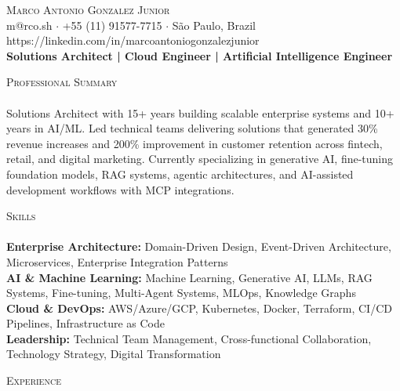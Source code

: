 \documentclass[a4paper]{article}
\newcommand{\lineunder} {
    \vspace*{-8pt} \\
    \hspace*{-18pt} \hrulefill \\
}
\newcommand{\header} [1] {
    {\hspace*{-18pt}\vspace*{6pt} \textsc{#1}}
    \vspace*{-6pt} \lineunder
}
\begin{document}
\newlength{\sectionindent}
\setlength{\sectionindent}{-0.4in} %

\renewcommand{\header}[1] {
    {\hspace*{-18pt}\vspace*{6pt} \textsc{#1}}
    \vspace*{-6pt} \lineunder
}
\vspace*{-40pt}

\vspace*{-10pt}
\begin{center}
    {\Huge \scshape {Marco Antonio Gonzalez Junior}}                \\
    \vspace{2.5pt}
    m@rco.sh $\cdot$ +55 (11) 91577-7715 $\cdot$ São Paulo, Brazil  \\
    \vspace{2.5pt}
    https://linkedin.com/in/marcoantoniogonzalezjunior              \\
    \vspace{1.25mm}
    \textbf{Solutions Architect | Cloud Engineer | Artificial Intelligence Engineer}
\end{center}
\vspace{-1.5mm}
\header{Professional Summary}
Solutions Architect with 15+ years building scalable enterprise systems and 10+ years in AI/ML. Led technical teams delivering solutions that generated 30\% revenue increases and 200\% improvement in customer retention across fintech, retail, and digital marketing. Currently specializing in generative AI, fine-tuning foundation models, RAG systems, agentic architectures, and AI-assisted development workflows with MCP integrations. \\
\vspace{0.5mm}
\header{Skills}
\vspace{0.5mm}
\textbf{Enterprise Architecture:} Domain-Driven Design, Event-Driven Architecture, Microservices, Enterprise Integration Patterns \\
\textbf{AI \& Machine Learning:} Machine Learning, Generative AI, LLMs, RAG Systems, Fine-tuning, Multi-Agent Systems, MLOps, Knowledge Graphs \\
\textbf{Cloud \& DevOps:} AWS/Azure/GCP, Kubernetes, Docker, Terraform, CI/CD Pipelines, Infrastructure as Code \\
\textbf{Leadership:} Technical Team Management, Cross-functional Collaboration, Technology Strategy, Digital Transformation \\
\vspace{0.5mm}
\header{Experience}
\end{document}
